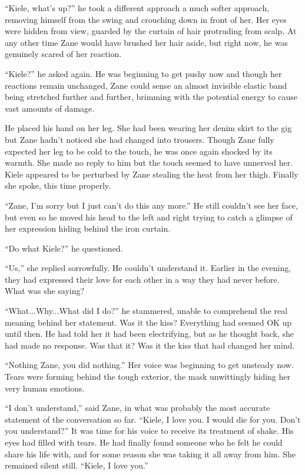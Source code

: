``Kiele, what's up?'' he took a different approach a much softer approach, removing himself from the swing and crouching down in front of her.  Her eyes were hidden from view, guarded by the curtain of hair protruding from scalp.  At any other time Zane would have brushed her hair aside, but right now, he was genuinely scared of her reaction.

``Kiele?'' he asked again.  He was beginning to get pushy now and though her reactions remain unchanged, Zane could sense an almost invisible elastic band being stretched further and further, brimming with the potential energy to cause vast amounts of damage.

He placed his hand on her leg.  She had been wearing her denim skirt to the gig but Zane hadn't noticed she had changed into trousers.  Though Zane fully expected her leg to be cold to the touch, he was once again shocked by its warmth.  She made no reply to him but the touch seemed to have unnerved her.  Kiele appeared to be perturbed by Zane stealing the heat from her thigh.  Finally she spoke, this time properly.

``Zane, I'm sorry but I just can't do this any more.''  He still couldn't see her face, but even so he moved his head to the left and right trying to catch a glimpse of her expression hiding behind the iron curtain.

``Do what Kiele?'' he questioned.

``Us,'' she replied sorrowfully.  He couldn't understand it.  Earlier in the evening, they had expressed their love for each other in a way they had never before.  What was she saying?

``What...Why...What did I do?'' he stammered, unable to comprehend the real meaning behind her statement.  Was it the kiss?  Everything had seemed OK up until then.  He had told her it had been electrifying, but as he thought back, she had made no response.  Was that it?  Was it the kiss that had changed her mind.

``Nothing Zane, you did nothing.''  Her voice was beginning to get unsteady now.  Tears were forming behind the tough exterior, the mask unwittingly hiding her very human emotions.

``I don't understand,'' said Zane, in what was probably the most accurate statement of the conversation so far.  ``Kiele, I love you.  I would die for you.  Don't you understand?''  It was time for his voice to receive its treatment of shake.  His eyes had filled with tears.  He had finally found someone who he felt he could share his life with, and for some reason she was taking it all away from him.  She remained silent still.  ``Kiele, I love you.''

